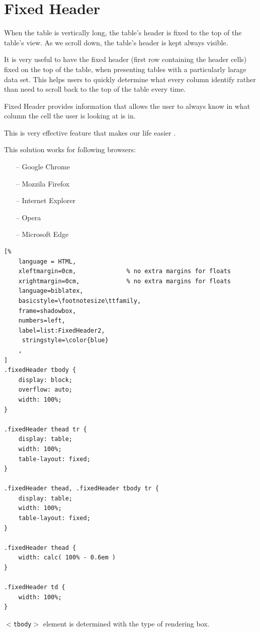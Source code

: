 \section{Fixed Header}
When the table is vertically long, the table's header is fixed to the top of the table's view.
As we scroll down, the table's header is kept always visible.

It is very useful to have the fixed header (first row containing the header cells) fixed on the top of the table, when presenting tables with a particularly larage data set. This helps users to quickly determine what every column identify rather than need to scroll back to the top of the table every time.

Fixed Header provides information that allows the user to always know in what column the cell the user is looking at is in.

This is very effective feature that makes our life easier \parencite{HS}.

This solution works for following browsers:
\begin{itemize}
    \item[--] Google Chrome
    \item[--] Mozzila Firefox
    \item[--] Internet Explorer
    \item[--] Opera
    \item[--] Microsoft Edge
\end{itemize}

\begin{lstlisting}[%
    language = HTML,
    xleftmargin=0cm,              % no extra margins for floats
    xrightmargin=0cm,             % no extra margins for floats
    language=biblatex,
    basicstyle=\footnotesize\ttfamily,
    frame=shadowbox,
    numbers=left,
    label=list:FixedHeader2,
     stringstyle=\color{blue}
    ,
]
.fixedHeader tbody {
    display: block;
    overflow: auto;
    width: 100%;
}

.fixedHeader thead tr {
    display: table;
    width: 100%;
    table-layout: fixed;
}

.fixedHeader thead, .fixedHeader tbody tr {
    display: table;
    width: 100%;
    table-layout: fixed;
}

.fixedHeader thead {
    width: calc( 100% - 0.6em )
}

.fixedHeader td {
    width: 100%;
}

\end{lstlisting}

$<$\texttt{tbody}$>$ element is determined with the type of rendering box.

